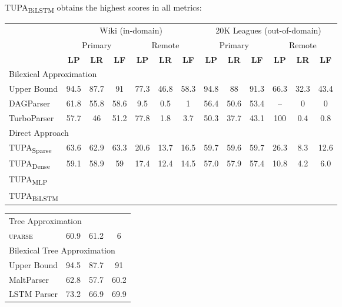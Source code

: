 \documentclass[a0,portrait]{a0poster}
\newcommand{\parser}[1]{TUPA\textsubscript{#1}}
\begin{document}
\begin{multicols}{2}
\parser{BiLSTM} obtains the highest scores in all metrics:
	  
\begin{center}
	\begin{tabular}{l|ccc|ccc||ccc|ccc}
	& \multicolumn{6}{c||}{Wiki (in-domain)} & \multicolumn{6}{c}{20K Leagues (out-of-domain)} \\
	& \multicolumn{3}{c|}{Primary} & \multicolumn{3}{c||}{Remote}
	& \multicolumn{3}{c|}{Primary} & \multicolumn{3}{c}{Remote} \\
	& \textbf{LP} & \textbf{LR} & \textbf{LF} & \textbf{LP} & \textbf{LR} & \textbf{LF}
	& \textbf{LP} & \textbf{LR} & \textbf{LF} & \textbf{LP} & \textbf{LR} & \textbf{LF} \\
	\hline
	\multicolumn{4}{l}{\rule{0pt}{2ex} \footnotesize Bilexical Approximation} \\
	\small Upper Bound
	& \small 94.5 & \small 87.7 & \small 91 & \small 77.3 & \small 46.8 & \small 58.3
	& \small 94.8 & \small 88 & \small 91.3 & \small 66.3 & \small 32.3 & 43.4 \\
	DAGParser \cite{ribeyre-villemontedelaclergerie-seddah:2014:SemEval}
	& 61.8 & 55.8 & 58.6 & 9.5 & 0.5 & 1
	& 56.4 & 50.6 & 53.4 & -- & 0 & 0 \\
	TurboParser \cite{almeida-martins:2015:SemEval}
	& 57.7 & 46 & 51.2 & 77.8 & 1.8 & 3.7
	& 50.3 & 37.7 & 43.1 & 100 & 0.4 & 0.8 \\
	\hline
	\multicolumn{4}{l}{\rule{0pt}{2ex} \footnotesize Direct Approach} \\
	\parser{Sparse}
	& 63.6 & 62.9 & 63.3 & 20.6 & 13.7 & 16.5
	& 59.7 & 59.6 & 59.7 & 26.3 & 8.3 & 12.6 \\
	\parser{Dense} 
	& 59.1 & 58.9 & 59 & 17.4 & 12.4 & 14.5
	& 57.0 & 57.9 & 57.4 & 10.8 & 4.2 & 6.0 \\
	\parser{MLP}
	&  \\
	\parser{BiLSTM}
	&
	\end{tabular}
\end{center}

\begin{table}
\hspace{22mm}
\begin{tabular}{l|ccc}
\hline
\multicolumn{4}{l}{\rule{0pt}{2ex} \footnotesize Tree Approximation} \\
\textsc{uparse} \cite{maier-lichte:2016:DiscoNLP} & 60.9 & 61.2 & 6 \\
\hline
\multicolumn{4}{l}{\rule{0pt}{2ex} \footnotesize Bilexical Tree Approximation} \\
\small Upper Bound & \small 94.5 & \small 87.7 & \small 91 \\
MaltParser \cite{nivre2007maltparser} & 62.8 & 57.7 & 60.2 \\
LSTM Parser \cite{dyer2015transition} & 73.2 & 66.9 & 69.9
\end{tabular}
\end{table}


\end{multicols}
\end{document}
